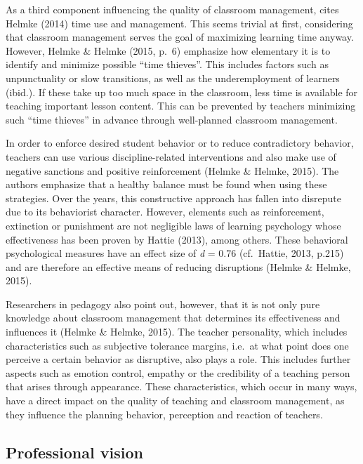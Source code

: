 \documentclass[
  man]{apa6}
\begin{document}
As a third component influencing the quality of classroom management, cites Helmke (2014) time use and management. This seems trivial at first, considering that classroom management serves the goal of maximizing learning time anyway. However, Helmke \& Helmke (2015, p.~6) emphasize how elementary it is to identify and minimize possible ``time thieves''. This includes factors such as unpunctuality or slow transitions, as well as the underemployment of learners (ibid.). If these take up too much space in the classroom, less time is available for teaching important lesson content. This can be prevented by teachers minimizing such ``time thieves'' in advance through well-planned classroom management.

In order to enforce desired student behavior or to reduce contradictory behavior, teachers can use various discipline-related interventions and also make use of negative sanctions and positive reinforcement (Helmke \& Helmke, 2015). The authors emphasize that a healthy balance must be found when using these strategies. Over the years, this constructive approach has fallen into disrepute due to its behaviorist character. However, elements such as reinforcement, extinction or punishment are not negligible laws of learning psychology whose effectiveness has been proven by Hattie (2013), among others. These behavioral psychological measures have an effect size of \emph{d} = 0.76 (cf.~Hattie, 2013, p.215) and are therefore an effective means of reducing disruptions (Helmke \& Helmke, 2015).

Researchers in pedagogy also point out, however, that it is not only pure knowledge about classroom management that determines its effectiveness and influences it (Helmke \& Helmke, 2015). The teacher personality, which includes characteristics such as subjective tolerance margins, i.e.~at what point does one perceive a certain behavior as disruptive, also plays a role. This includes further aspects such as emotion control, empathy or the credibility of a teaching person that arises through appearance. These characteristics, which occur in many ways, have a direct impact on the quality of teaching and classroom management, as they influence the planning behavior, perception and reaction of teachers.

\hypertarget{professional-vision}{%
\subsection{Professional vision}\label{professional-vision}}
\end{document}
